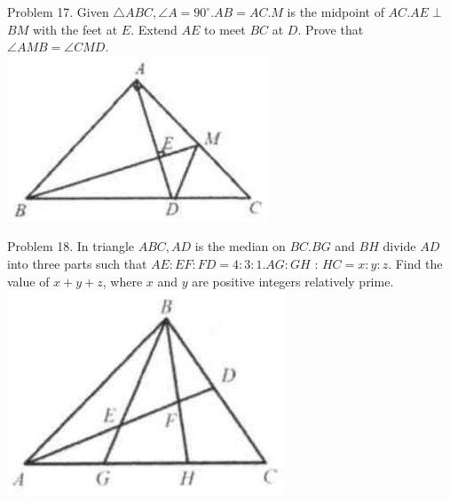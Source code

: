 \documentclass[10pt]{article}
\begin{document}
Problem 17. Given \(\triangle A B C, \angle A=90^{\circ} . A B=A C . M\) is the midpoint of \(A C . A E \perp\) \(B M\) with the feet at \(E\). Extend \(A E\) to meet \(B C\) at \(D\). Prove that \(\angle A M B=\angle C M D\).\\
\includegraphics[max width=\textwidth, center]{2025_04_17_97bc1f7e44d93c271a88g-129(3)}

Problem 18. In triangle \(A B C, A D\) is the median on \(B C . B G\) and \(B H\) divide \(A D\) into three parts such that \(A E: E F: F D=4: 3: 1 . A G: G H\) : \(H C=x: y: z\). Find the value of \(x+y+z\), where \(x\) and \(y\) are positive integers relatively prime.\\
\includegraphics[max width=\textwidth, center]{2025_04_17_97bc1f7e44d93c271a88g-129(2)}
\end{document}
